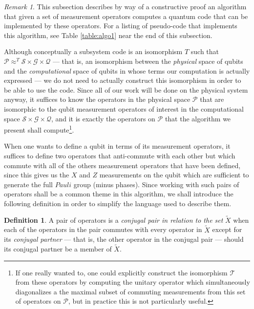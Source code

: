 \documentclass{amsbook}
\theoremstyle{plain}
\theoremstyle{definition}
\newtheorem{definition}{Definition}
\theoremstyle{remark}
\newtheorem{remark}{Remark}
\newcommand{\set}{\tilde}
\begin{document}
\begin{remark}
This subsection describes by way of a constructive proof an algorithm that given a set of measurement operators computes a quantum code that can be implemented by these operators.  For a listing of pseudo-code that implements this algorithm, see Table \ref{table:algo1} near the end of this subsection.
\end{remark}
Although conceptually a subsystem code is an isomorphism $T$ such that  $\mathscr{P}\approx^T \mathscr{S}\times\mathscr{G}\times\mathscr{Q}$ --- that is, an isomorphism between the \emph{physical} space of qubits and the \emph{computational} space of qubits in whose terms our computation is actually expressed --- we do not need to actually construct this isomorphism in order to be able to use the code.  Since all of our work will be done on the physical system anyway, it suffices to know the operators in the physical space $\mathscr{P}$ that are isomorphic to the qubit measurement operators of interest in the computational space $\mathscr{S}\times\mathscr{G}\times\mathscr{Q}$, and it is exactly the operators on $\mathscr{P}$ that the algorithm we present shall compute\footnote{If one really wanted to, one could explicitly construct the isomorphism $\mathscr{T}$ from these operators by computing the unitary operator which simultaneously diagonalizes a the maximal subset of commuting measurements from this set of operators on $\mathscr{P}$, but in practice this is not particularly useful.}.

When one wants to define a qubit in terms of its measurement operators, it suffices to define two operators that anti-commute with each other but which commute with all of the others measurement operators that have been defined, since this gives us the $X$ and $Z$ measurements on the qubit which are sufficient to generate the full $Pauli$ group (minus phases).  Since working with such pairs of operators shall be a common theme in this algorithm, we shall introduce the following definition in order to simplify the language used to describe them.

\begin{definition} A pair of operators is a \emph{conjugal pair in relation to the set} $\set X$ when each of the operators in the pair commutes with every operator in $\set X$ except for its \emph{conjugal partner} --- that is, the other operator in the conjugal pair --- should its conjugal partner be a member of $\set X$.
\label{conjugal-pair-definition}
\end{definition}
\end{document}
